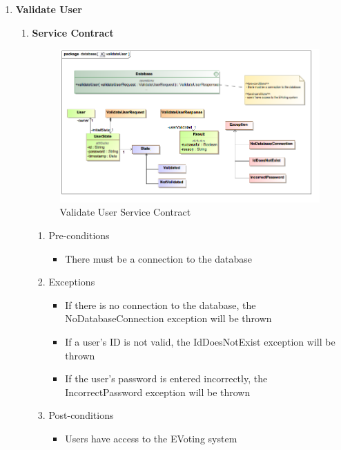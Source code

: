 \begin{enumerate}
	\item \textbf{Validate User}
		\begin{enumerate}
			\item \textbf{Service Contract}
				\begin{figure}[H]
					\centering
					\includegraphics[width=0.75\linewidth]{../Images/Database/ServiceContracts/ValidateUser_ServiceContract.png}
					\caption{Validate User Service Contract}
				\end{figure}
								
				\begin{enumerate}
					\item Pre-conditions
					\begin{itemize}
						\item There must be a connection to the database
					\end{itemize}
					
					\item Exceptions
					\begin{itemize}
						\item If there is no connection to the database, the NoDatabaseConnection exception will be thrown
						\item If a user's ID is not valid, the IdDoesNotExist exception will be thrown
						\item If the user's password is entered incorrectly, the IncorrectPassword exception will be thrown
					\end{itemize}
					
					\item Post-conditions
					\begin{itemize}
						\item Users have access to the EVoting system
					\end{itemize}
				\end{enumerate}
			

\end{enumerate}
\end{enumerate}
